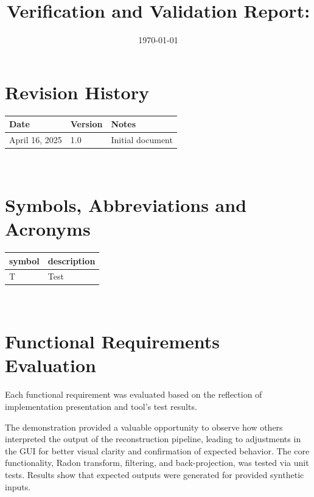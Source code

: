\documentclass[12pt, titlepage]{article}
\begin{document}
\title{Verification and Validation Report: \progname}
\author{\authname}
\date{\today}
\maketitle


\section{Revision History}

\begin{tabularx}{\textwidth}{p{3cm}p{2cm}X}
\toprule {\bf Date} & {\bf Version} & {\bf Notes}\\
\midrule
April 16, 2025 & 1.0 & Initial document\\
\bottomrule
\end{tabularx}

~\newpage

\section{Symbols, Abbreviations and Acronyms}

\renewcommand{\arraystretch}{1.2}
\begin{tabular}{l l}
  \toprule
  \textbf{symbol} & \textbf{description}\\
  \midrule
  T & Test\\
  \bottomrule
\end{tabular}\\


\newpage

\tableofcontents

\listoftables %

\listoffigures %

\newpage


\section{Functional Requirements Evaluation}
Each functional requirement was evaluated based on the reflection of
implementation presentation and tool's test
results.

The demonstration provided a valuable opportunity to observe how others
interpreted the output of the reconstruction pipeline, leading to adjustments in
the GUI for better visual clarity and confirmation of expected behavior. The
core functionality, Radon transform, filtering, and back-projection, was
tested via unit tests. Results show that expected outputs were generated for
provided synthetic inputs.
\end{document}
